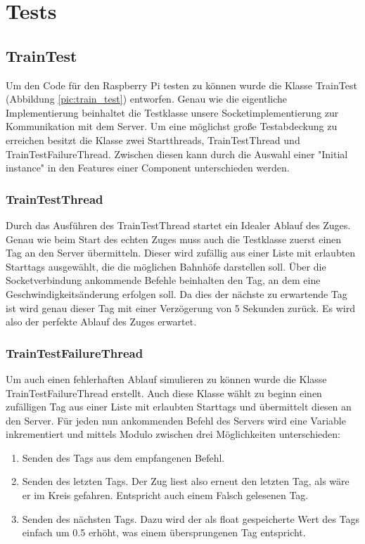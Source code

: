 \chapter{Tests}

\section{TrainTest}

Um den Code für den Raspberry Pi testen zu können wurde die Klasse TrainTest (Abbildung \ref{pic:train_test}) entworfen. Genau wie die eigentliche Implementierung beinhaltet die Testklasse unsere Socketimplementierung zur Kommunikation mit dem Server. Um eine möglichst große Testabdeckung zu erreichen besitzt die Klasse zwei Startthreads, TrainTestThread und TrainTestFailureThread. Zwischen diesen kann durch die Auswahl einer "Initial instance" in den Features einer Component unterschieden werden.

\subsection{TrainTestThread}

Durch das Ausführen des TrainTestThread startet ein Idealer Ablauf des Zuges. Genau wie beim Start des echten Zuges muss auch die Testklasse zuerst einen Tag an den Server übermitteln. Dieser wird zufällig aus einer Liste mit erlaubten Starttags ausgewählt, die die möglichen Bahnhöfe darstellen soll. Über die Socketverbindung ankommende Befehle beinhalten den Tag, an dem eine Geschwindigkeitsänderung erfolgen soll. Da dies der nächste zu erwartende Tag ist wird genau dieser Tag mit einer Verzögerung von 5 Sekunden zurück. Es wird also der perfekte Ablauf des Zuges erwartet.

\subsection{TrainTestFailureThread}

Um auch einen fehlerhaften Ablauf simulieren zu können wurde die Klasse TrainTestFailureThread erstellt. Auch diese Klasse wählt zu beginn einen zufälligen Tag aus einer Liste mit erlaubten Starttags und übermittelt diesen an den Server. Für jeden nun ankommenden Befehl des Servers wird eine Variable inkrementiert und mittels Modulo zwischen drei Möglichkeiten unterschieden:

\begin{enumerate}
	\item Senden des Tags aus dem empfangenen Befehl.
	\item Senden des letzten Tags. Der Zug liest also erneut den letzten Tag, als wäre er im Kreis gefahren. Entspricht auch einem Falsch gelesenen Tag.
	\item Senden des nächsten Tags. Dazu wird der als float gespeicherte Wert des Tags einfach um 0.5 erhöht, was einem übersprungenen Tag entspricht.
\end{enumerate}

